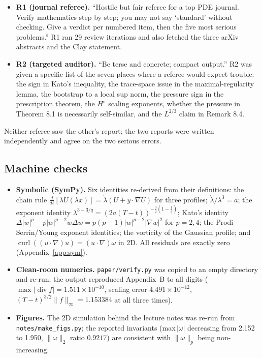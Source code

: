 \documentclass[11pt,a4paper]{article}
\begin{document}
\begin{itemize}[leftmargin=1.6em]
\item \textbf{R1 (journal referee).} ``Hostile but fair referee for a top PDE journal. Verify
mathematics step by step; you may not say `standard' without checking. Give a verdict per
numbered item, then the five most serious problems.'' R1 ran 29 review iterations and also
fetched the three arXiv abstracts and the Clay statement.
\item \textbf{R2 (targeted auditor).} ``Be terse and concrete; compact output.'' R2 was given a
specific list of the seven places where a referee would expect trouble: the sign in Kato's
inequality, the trace-space issue in the maximal-regularity lemma, the bootstrap to a local
sup norm, the pressure sign in the prescription theorem, the $H^s$ scaling exponents, whether
the pressure in Theorem 8.1 is necessarily self-similar, and the $L^{2/3}$ claim in
Remark 8.4.
\end{itemize}

Neither referee saw the other's report; the two reports were written independently and agree on
the two serious errors.

\subsection{Machine checks}

\begin{itemize}[leftmargin=1.6em]
\item \textbf{Symbolic (SymPy).} Six identities re-derived from their definitions: the chain
rule $\frac{d}{dt}[\lambda U(\lambda x)]=\dot\lambda(U+y\cdot\nabla U)$ for three profiles;
$\dot\lambda/\lambda^3=a$; the exponent identity
$\lambda^{3-3/q}=(2a(T-t))^{-\frac32(1-\frac1q)}$; Kato's identity
$\Delta|w|^p-p|w|^{p-2}w\Delta w=p(p-1)|w|^{p-2}|\nabla w|^2$ for $p=2,4$; the
Prodi--Serrin/Young exponent identities; the vorticity of the Gaussian profile; and
$\operatorname{curl}((u\cdot\nabla)u)=(u\cdot\nabla)\omega$ in 2D. All residuals are exactly
zero (Appendix~\ref{app:sym}).
\item \textbf{Clean-room numerics.} \texttt{paper/verify.py} was copied to an empty directory and
re-run; the output reproduced Appendix~B to all digits
($\max|\operatorname{div}f|=1.511\times10^{-10}$, scaling error $4.491\times10^{-12}$,
$(T-t)^{3/2}\|f\|_\infty=1.153384$ at all three times).
\item \textbf{Figures.} The 2D simulation behind the lecture notes was re-run from
\texttt{notes/make\_figs.py}; the reported invariants (max$\,|\omega|$ decreasing from 2.152 to
1.950, $\|\omega\|_2$ ratio $0.9217$) are consistent with $\|\omega\|_p$ being non-increasing.
\end{itemize}
\end{document}
